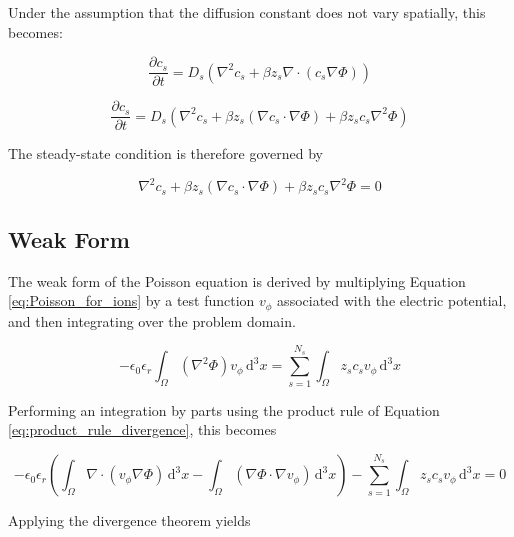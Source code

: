 Under the assumption that the diffusion constant does not vary spatially,
this becomes:

\begin{equation}
\frac{\partial c_s}{\partial t} = 
D_s \left( \nabla^2 c_s + \beta z_s \nabla \cdot \left( c_s \nabla \Phi \right) \right)
\end{equation}

\begin{equation}\label{eq:PNP_timedep}
\frac{\partial c_s}{\partial t} = 
D_s \left( \nabla^2 c_s + \beta z_s \left( \nabla c_s \cdot \nabla \Phi \right)  + \beta z_s c_s \nabla^2 \Phi \right)
\end{equation}

The steady-state condition is therefore governed by

\begin{equation}\label{eq:PNP_steady_state_gov}
\nabla^2 c_s + \beta z_s \left( \nabla c_s \cdot \nabla \Phi \right)  + \beta z_s c_s \nabla^2 \Phi = 0
\end{equation}


\subsection{Weak Form}\label{subsec:unhom_pnp_weak}

The weak form of the Poisson equation is derived by multiplying
Equation \ref{eq:Poisson_for_ions} by a test function $v_\phi$
associated with the electric potential,
and then integrating over the problem domain.

\begin{equation}
-\epsilon_{0}\epsilon_{r} \int_\Omega \left( \nabla^2 \Phi \right) v_\phi \,\mathrm{d}^3x
 = \sum_{s=1}^{N_s} \int_\Omega z_s c_s v_\phi \,\mathrm{d}^3x
\end{equation}

Performing an integration by parts using the product rule
of Equation \ref{eq:product_rule_divergence}, this becomes

\begin{equation}
-\epsilon_{0}\epsilon_{r}
\left( \int_\Omega \nabla \cdot \left( v_\phi \nabla \Phi \right) \,\mathrm{d}^3x
- \int_\Omega  \left( \nabla \Phi \cdot \nabla v_\phi \right) \,\mathrm{d}^3x \right)
- \sum_{s=1}^{N_s} \int_\Omega z_s c_s v_\phi \,\mathrm{d}^3x = 0
\end{equation}

Applying the divergence theorem yields

